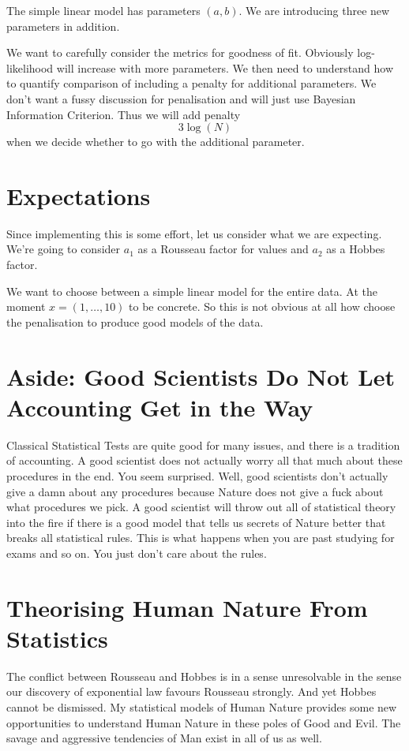 \documentclass{amsart}
\begin{document}
The simple linear model has parameters $(a,b)$.  We are introducing three new parameters in addition. 

We want to carefully consider the metrics for goodness of fit.  Obviously log-likelihood will increase with more parameters.  We then need to understand how to quantify comparison of including a penalty for additional parameters.  We don't want a fussy discussion for penalisation and will just use Bayesian Information Criterion.  Thus we will add penalty 
\[
3 \log(N)
\]
when we decide whether to go with the additional parameter.

\section{Expectations}

Since implementing this is some effort, let us consider what we are expecting.  We're going to consider $a_1$ as a Rousseau factor for values and $a_2$ as a Hobbes factor.  

We want to choose between a simple linear model for the entire data.  At the moment $x=(1,\dots,10)$ to be concrete.  So this is not obvious at all how choose the penalisation to produce good models of the data.

\section{Aside:  Good Scientists Do Not Let Accounting Get in the Way}

Classical Statistical Tests are quite good for many issues, and there is a tradition of accounting.  A good scientist does not actually worry all that much about these procedures in the end.  You seem surprised. Well, good scientists don't actually give a damn about any procedures because Nature does not give a fuck about what procedures we pick.  A good scientist will throw out all of statistical theory into the fire if there is a good model that tells us secrets of Nature better that breaks all statistical rules.  This is what happens when you are past studying for exams and so on.  You just don't care about the rules.

\section{Theorising Human Nature From Statistics}

The conflict between Rousseau and Hobbes is in a sense unresolvable in the sense our discovery of exponential law favours Rousseau strongly.  And yet Hobbes cannot be dismissed.  My statistical models of Human Nature provides some new opportunities to understand Human Nature in these poles of Good and Evil.  The savage and aggressive tendencies of Man exist in all of us as well. 
\end{document}
